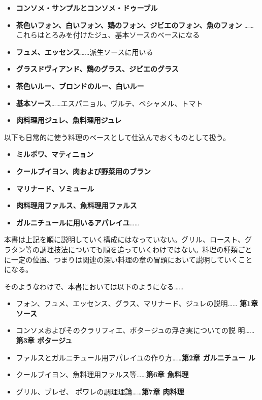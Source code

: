 \begin{itemize}
\tightlist
\item
  \textbf{コンソメ・サンプルとコンソメ・ドゥーブル}
\item
  \textbf{茶色いフォン、白いフォン、鶏のフォン、ジビエのフォン、魚のフォン
  }\ldots{}\ldots{}これらはとろみを付けたジュ、基本ソースのベースになる
\item
  \textbf{フュメ、エッセンス}\ldots{}\ldots{}派生ソースに用いる
\item
  \textbf{グラスドヴィアンド、鶏のグラス、ジビエのグラス}
\item
  \textbf{茶色いルー、ブロンドのルー、白いルー}
\item
  \textbf{基本ソース}\ldots{}\ldots{}エスパニョル、ヴルテ、ベシャメル、トマト
\item
  \textbf{肉料理用ジュレ、魚料理用ジュレ}
\end{itemize}

以下も日常的に使う料理のベースとして仕込んでおくものとして扱う。

\begin{itemize}
\tightlist
\item
  \textbf{ミルポワ、マティニョン}
\item
  \textbf{クールブイヨン、肉および野菜用のブラン}
\item
  \textbf{マリナード、ソミュール}
\item
  \textbf{肉料理用ファルス、魚料理用ファルス}
\item
  \textbf{ガルニチュールに用いるアパレイユ}\ldots{}\ldots{}
\end{itemize}

本書は上記を順に説明していく構成にはなっていない。グリル、ロースト、グ
ラタン等の調理技法についても順を追っていくわけではない。料理の種類ごと
に一定の位置、つまりは関連の深い料理の章の冒頭において説明していくこと
になる。

そのようなわけで、本書においては以下のようになる\ldots{}\ldots{}

\begin{itemize}
\tightlist
\item
  フォン、フュメ、エッセンス、グラス、マリナード、ジュレの説明\ldots{}\ldots{}
  \textbf{ 第1章 ソース}
\item
  コンソメおよびそのクラリフィエ、ポタージュの浮き実についての説
  明\ldots{}\ldots{}\textbf{第3章 ポタージュ}
\item
  ファルスとガルニチュール用アパレイユの作り方\ldots{}\ldots{}\textbf{第2章
  ガルニチュー ル}
\item
  クールブイヨン、魚料理用ファルス等\ldots{}\ldots{}\textbf{第6章
  魚料理}
\item
  グリル、ブレゼ、 ポワレの調理理論\ldots{}\ldots{}\textbf{第7章 肉料理}
\end{itemize}

